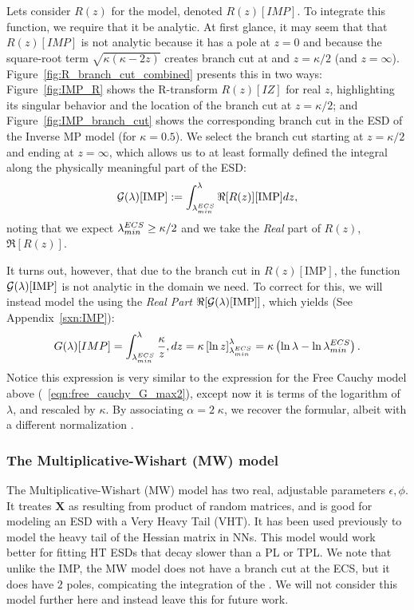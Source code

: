 Lets consider $R(z)$ for the \InverseMP model, denoted $R(z)[IMP]$.
To integrate this function, we require that it be analytic.
At first glance, it may seem that that $R(z)[IMP]$ is not analytic because it
has a pole at $z=0$ and because the square-root term $\sqrt{\kappa(\kappa-2z)}$  creates branch
cut at and $z=\kappa/2$ (and $z=\infty$).
Figure~\ref{fig:R_branch_cut_combined} presents this in two ways:
Figure~\ref{fig:IMP_R} shows the R-transform $R(z)[IZ]$ for real $z$, highlighting its singular behavior and the location of the branch cut at $z = \kappa/2$; and
Figure~\ref{fig:IMP_branch_cut} shows the corresponding branch cut in the ESD of the Inverse MP model (for $\kappa = 0.5$).
We select the branch cut starting at $z=\kappa/2$ and ending at $z=\infty$,
which allows us to at least formally defined the integral along the physically meaningful part of the ESD:
\begin{equation}
\label{eqn:IMP_model_1} 
\mathcal{G(\lambda)}[\mathrm{IMP}] := \int_{\lambda^{ECS}_{min}}^{\lambda} \Re[R(z)][\mathrm{IMP}] dz  ,
\end{equation}
noting that we expect $\lambda^{ECS}_{min}\ge\kappa/2$ and we take the \emph{Real} part of $R(z)$, $\Re[R(z)]$.

It turns out, however, that due to the branch cut in $R(z)[\mathrm{IMP}]$,
the function $\mathcal{G(\lambda)}[\mathrm{IMP}]$ is not analytic in the domain we need. 
To correct for this, we will instead model the \LayerQualitySquared using the \emph{Real Part} $\Re[\mathcal{G(\lambda)}[\mathrm{IMP}]]$,
which yields (See Appendix~\ref{sxn:IMP}):
\begin{equation}
  \label{eqn:IMP_model_2}
G(\lambda)[IMP] = \int_{\lambda^{ECS}_{min}}^\lambda \frac{\kappa}{z} , dz = \kappa \left[ \ln z \right]_{\lambda^{ECS}_{min}}^\lambda = \kappa \left( \ln \lambda - \ln \lambda^{ECS}_{min}\right).
\end{equation}
Notice this expression is very similar to the expression for the Free Cauchy model above (\EQN~\ref{eqn:free_cauchy_G_max2}), except
now it is terms of the logarithm of $\lambda$, and rescaled by $\kappa$.
By associating $\alpha=2\;\kappa$, we recover the \ALPHAHAT formular, albeit with a different normalization .

\subsubsection{The Multiplicative-Wishart (MW) model}
The Multiplicative-Wishart (MW) model  has two real, adjustable parameters $\epsilon,\phi$.
It treates $\mathbf{X}$ as resulting from product of random matrices, and is good for modeling an ESD with a Very Heavy Tail (VHT).
It has been used previously to model the heavy tail of the Hessian matrix in NNs\cite{PW16_NIPS}.
This model would work better for fitting HT ESDs that decay slower than a PL or TPL.
We note that unlike the IMP, the MW model does not have a branch cut at the ECS, but it does
have $2$ poles, compicating the integration of the  \RTransform.
We will not consider this model further here and instead leave this for future work.


